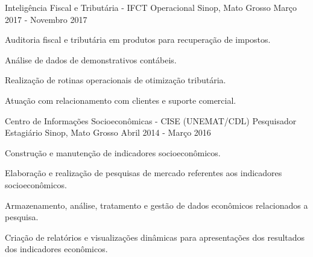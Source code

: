 \documentclass[11pt, letter]{awesome-cv}
\begin{document}
\vspace{-5mm}
\vspace{-3mm}
\begin{cventries}
	\cventry
	{Inteligência Fiscal e Tributária - IFCT}
	{Operacional\vspace{-2mm}}
	{Sinop, Mato Grosso\vspace{-2mm}}
	{Março 2017 - Novembro 2017}
	{
		\begin{cvitems}
			\item {Auditoria fiscal e tributária em produtos para recuperação de impostos.}
			\item {Análise de dados de demonstrativos contábeis.}
			\item {Realização de rotinas operacionais de otimização tributária.}
			\item{Atuação com relacionamento com clientes e suporte comercial.\vspace{-2mm}}
		\end{cvitems}
	}
	\cventry
	{Centro de Informações Socioeconômicas - CISE (UNEMAT/CDL)}
	{Pesquisador Estagiário\vspace{-2mm}}
	{Sinop, Mato Grosso\vspace{-2mm}}
	{Abril 2014 - Março 2016}
	{
		\begin{cvitems}
			\item {Construção e manutenção de indicadores socioeconômicos.}
			\item {Elaboração e realização de pesquisas de mercado referentes aos indicadores socioeconômicos.}
			\item {Armazenamento, análise, tratamento e gestão de dados econômicos relacionados a pesquisa.}
			\item {Criação de relatórios e visualizações dinâmicas para apresentações dos resultados dos indicadores econômicos.\vspace{-2mm}}
		\end{cvitems}
	}
\end{cventries}
\vspace{-5mm}
\vspace{-3mm}
\end{document}

